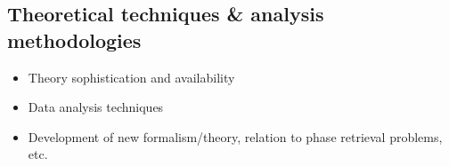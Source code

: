 \subsection{Theoretical techniques \& analysis methodologies}



\begin{itemize}
\item Theory sophistication and availability
\item Data analysis techniques
\item Development of new formalism/theory, relation to phase retrieval problems, etc.
\end{itemize}